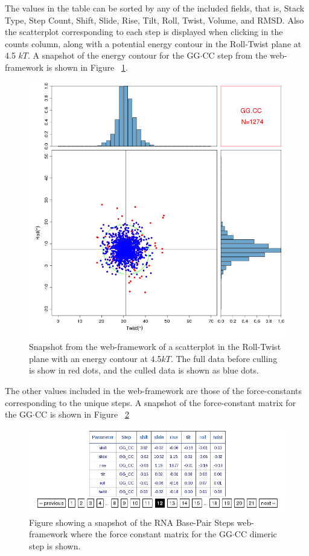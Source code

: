 The values in  the table can be sorted by any  of the included fields,
that  is, Stack  Type, Step  Count,  Shift, Slide,  Rise, Tilt,  Roll,
Twist, Volume,  and RMSD. Also  the scatterplot corresponding  to each
step is  displayed when  clicking in the  counts column, along  with a
potential  energy contour  in  the  Roll-Twist plane  at  4.5 $kT$.  A
snapshot  of the  energy contour  for  the GG$\cdot$CC  step from  the
web-framework is shown in Figure ~\ref{fig:contour}.
\begin{figure}[htbp]
\centering
\includegraphics[angle=0, scale=0.6]{Chapter4/contour.png}
\caption{Snapshot from the web-framework of a scatterplot in the
  Roll-Twist plane with an energy contour at 4.5$kT$. The full data before
  culling is show in red dots, and the culled data is shown as blue dots.} 
\label{fig:contour}
\end{figure}

The  other values  included  in  the web-framework  are  those of  the
force-constants corresponding  to the unique steps. A  snapshot of the
force-constant  matrix   for  the  GG$\cdot$CC  is   shown  in  Figure
~\ref{fig:forceconst}

\begin{figure}[htbp]
\centering
\includegraphics[angle=0, scale=0.6]{Chapter4/forceconst.png}
\caption{Figure showing a snapshot of the RNA Base-Pair Steps
  web-framework where the force constant matrix for the GG$\cdot$CC dimeric
  step is shown.}
\label{fig:forceconst}
\end{figure}  

